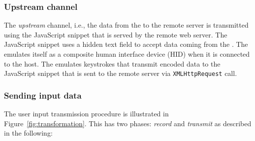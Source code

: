 \subsubsection{Upstream channel}\label{sec:systemDesign:commit:upload} The \emph{upstream} channel, i.e., the data from the \device to the remote server is transmitted using the \name JavaScript snippet that is served by the remote web server. The \name JavaScript snippet uses a hidden text field to accept data coming from the \device. The \device emulates itself as a composite human interface device (HID) when it is connected to the host. The \device emulates keystrokes that transmit encoded data to the \name JavaScript snippet that is sent to the remote server via \texttt{XMLHttpRequest} call.

\subsubsection{Sending input data}\label{sec:systemDesign:commit:send}
The user input transmission procedure is illustrated in Figure~\ref{fig:transformation}. This has two phases: \emph{record} and \emph{transmit} as described in the following:

